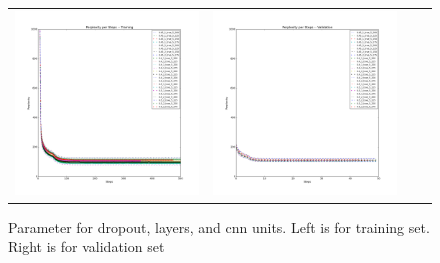 \documentclass{article}
\begin{document}
\begin{figure}[h]
\centering
\begin{subfigure}
  \begin{tabular}{cccc}
  {\includegraphics[width = 50mm]{../lstm_me/fig/alltest_onlySoft_train.png}}&
  {\includegraphics[width = 50mm]{../lstm_me/fig/alltest_onlySoft_val.png}}
  \end{tabular}
\end{subfigure}
\caption{Parameter for dropout, layers, and cnn units. Left is for training set. Right is for validation set}
\end{figure}
\end{document}
